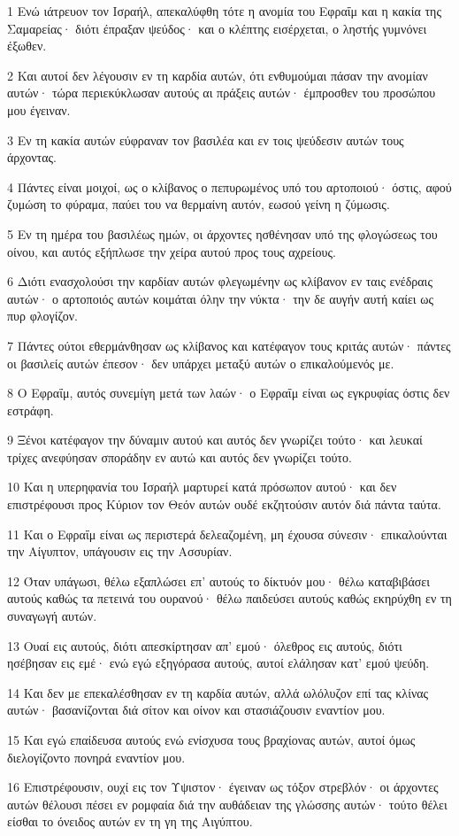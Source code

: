 \par 1 Ενώ ιάτρευον τον Ισραήλ, απεκαλύφθη τότε η ανομία του Εφραΐμ και η κακία της Σαμαρείας· διότι έπραξαν ψεύδος· και ο κλέπτης εισέρχεται, ο ληστής γυμνόνει έξωθεν.
\par 2 Και αυτοί δεν λέγουσιν εν τη καρδία αυτών, ότι ενθυμούμαι πάσαν την ανομίαν αυτών· τώρα περιεκύκλωσαν αυτούς αι πράξεις αυτών· έμπροσθεν του προσώπου μου έγειναν.
\par 3 Εν τη κακία αυτών εύφραναν τον βασιλέα και εν τοις ψεύδεσιν αυτών τους άρχοντας.
\par 4 Πάντες είναι μοιχοί, ως ο κλίβανος ο πεπυρωμένος υπό του αρτοποιού· όστις, αφού ζυμώση το φύραμα, παύει του να θερμαίνη αυτόν, εωσού γείνη η ζύμωσις.
\par 5 Εν τη ημέρα του βασιλέως ημών, οι άρχοντες ησθένησαν υπό της φλογώσεως του οίνου, και αυτός εξήπλωσε την χείρα αυτού προς τους αχρείους.
\par 6 Διότι ενασχολούσι την καρδίαν αυτών φλεγωμένην ως κλίβανον εν ταις ενέδραις αυτών· ο αρτοποιός αυτών κοιμάται όλην την νύκτα· την δε αυγήν αυτή καίει ως πυρ φλογίζον.
\par 7 Πάντες ούτοι εθερμάνθησαν ως κλίβανος και κατέφαγον τους κριτάς αυτών· πάντες οι βασιλείς αυτών έπεσον· δεν υπάρχει μεταξύ αυτών ο επικαλούμενός με.
\par 8 Ο Εφραΐμ, αυτός συνεμίγη μετά των λαών· ο Εφραΐμ είναι ως εγκρυφίας όστις δεν εστράφη.
\par 9 Ξένοι κατέφαγον την δύναμιν αυτού και αυτός δεν γνωρίζει τούτο· και λευκαί τρίχες ανεφύησαν σποράδην εν αυτώ και αυτός δεν γνωρίζει τούτο.
\par 10 Και η υπερηφανία του Ισραήλ μαρτυρεί κατά πρόσωπον αυτού· και δεν επιστρέφουσι προς Κύριον τον Θεόν αυτών ουδέ εκζητούσιν αυτόν διά πάντα ταύτα.
\par 11 Και ο Εφραΐμ είναι ως περιστερά δελεαζομένη, μη έχουσα σύνεσιν· επικαλούνται την Αίγυπτον, υπάγουσιν εις την Ασσυρίαν.
\par 12 Όταν υπάγωσι, θέλω εξαπλώσει επ' αυτούς το δίκτυόν μου· θέλω καταβιβάσει αυτούς καθώς τα πετεινά του ουρανού· θέλω παιδεύσει αυτούς καθώς εκηρύχθη εν τη συναγωγή αυτών.
\par 13 Ουαί εις αυτούς, διότι απεσκίρτησαν απ' εμού· όλεθρος εις αυτούς, διότι ησέβησαν εις εμέ· ενώ εγώ εξηγόρασα αυτούς, αυτοί ελάλησαν κατ' εμού ψεύδη.
\par 14 Και δεν με επεκαλέσθησαν εν τη καρδία αυτών, αλλά ωλόλυζον επί τας κλίνας αυτών· βασανίζονται διά σίτον και οίνον και στασιάζουσιν εναντίον μου.
\par 15 Και εγώ επαίδευσα αυτούς ενώ ενίσχυσα τους βραχίονας αυτών, αυτοί όμως διελογίζοντο πονηρά εναντίον μου.
\par 16 Επιστρέφουσιν, ουχί εις τον Υψιστον· έγειναν ως τόξον στρεβλόν· οι άρχοντες αυτών θέλουσι πέσει εν ρομφαία διά την αυθάδειαν της γλώσσης αυτών· τούτο θέλει είσθαι το όνειδος αυτών εν τη γη της Αιγύπτου.

